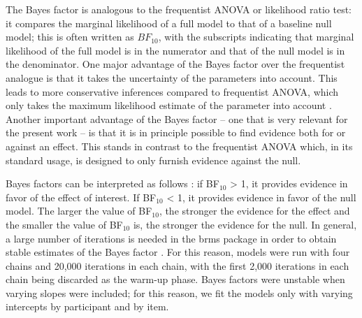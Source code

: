 \documentclass[a4paper, man, floatsintext]{apa7}
\begin{document}
The Bayes factor is analogous to the frequentist ANOVA or likelihood ratio test: it compares the marginal likelihood of a full model to that of a baseline null model; this is often written as $BF_{10}$, with the subscripts indicating that marginal likelihood of the full model is in the numerator and that of the null model is in the denominator. One major advantage of the Bayes factor over the frequentist analogue is that it takes the uncertainty of the parameters into account. This leads to more conservative inferences compared to frequentist ANOVA, which only takes the maximum likelihood estimate of the parameter into account \parencite[see][for detailed discussion]{schad_etal_2022_BF}. Another important advantage of the Bayes factor -- one that is very relevant for the present work -- is that it is in principle possible to find evidence both for or against an effect. This stands in contrast to the frequentist ANOVA which, in its standard usage, is designed to only furnish evidence against the null. 

Bayes factors can be interpreted as follows \parencite[e.g., ][]{lee2014bayesian}: if BF$_{10}$ > 1, it provides evidence in favor of the effect of interest. If BF$_{10}$ < 1, it provides evidence in favor of the null model. The larger the value of BF$_{10}$, the stronger the evidence for the effect and the smaller the value of BF$_{10}$ is, the stronger the evidence for the null. 
In general, a large number of iterations is needed in the brms package in order to obtain stable estimates of the Bayes factor  \citep{schad_etal_2022_BF}.
For this reason, models were run with four chains and 20,000 iterations in each chain, with the first 2,000 iterations in each chain being discarded as the warm-up phase.  Bayes factors were unstable when varying slopes were included; for this reason, we fit the models only with varying intercepts by participant and by item.
\end{document}
